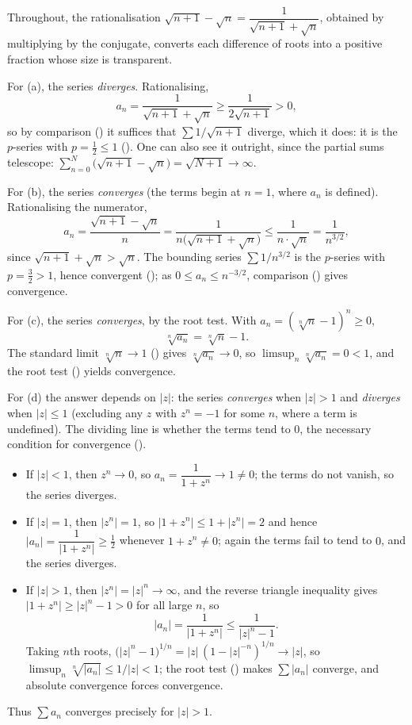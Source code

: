 \documentclass[main.tex]{subfiles}
\begin{document}
\begin{SolutionBlue}
Throughout, the rationalisation $\sqrt{n+1}-\sqrt n=\dfrac{1}{\sqrt{n+1}+\sqrt n}$, obtained by
multiplying by the conjugate, converts each difference of roots into a positive fraction whose size is
transparent.

For (a), the series \emph{diverges}. Rationalising,
\[
a_n=\frac{1}{\sqrt{n+1}+\sqrt n}\ge\frac{1}{2\sqrt{n+1}}>0,
\]
so by comparison () it suffices that $\sum 1/\sqrt{n+1}$ diverge, which it does: it is the
$p$-series with $p=\tfrac12\le 1$ (). One can also see it outright, since the partial sums
telescope: $\sum_{n=0}^{N}\bigl(\sqrt{n+1}-\sqrt n\bigr)=\sqrt{N+1}\to\infty$.

For (b), the series \emph{converges} (the terms begin at $n=1$, where $a_n$ is defined). Rationalising
the numerator,
\[
a_n=\frac{\sqrt{n+1}-\sqrt n}{n}=\frac{1}{n\bigl(\sqrt{n+1}+\sqrt n\bigr)}
   \le\frac{1}{n\cdot\sqrt n}=\frac{1}{n^{3/2}} ,
\]
since $\sqrt{n+1}+\sqrt n>\sqrt n$. The bounding series $\sum 1/n^{3/2}$ is the $p$-series with
$p=\tfrac32>1$, hence convergent (); as $0\le a_n\le n^{-3/2}$, comparison
() gives convergence.

For (c), the series \emph{converges}, by the root test. With $a_n=(\sqrt[n]{n}-1)^n\ge 0$,
\[
\sqrt[n]{a_n}=\sqrt[n]{n}-1 .
\]
The standard limit $\sqrt[n]{n}\to 1$ () gives $\sqrt[n]{a_n}\to 0$, so
$\limsup_{n}\sqrt[n]{a_n}=0<1$, and the root test () yields convergence.

For (d) the answer depends on $|z|$: the series \emph{converges} when $|z|>1$ and \emph{diverges} when
$|z|\le 1$ (excluding any $z$ with $z^n=-1$ for some $n$, where a term is undefined). The dividing line
is whether the terms tend to $0$, the necessary condition for convergence ().
\begin{itemize}[leftmargin=1.5em,itemsep=2pt,topsep=2pt]
  \item If $|z|<1$, then $z^n\to 0$, so $a_n=\dfrac{1}{1+z^n}\to 1\neq 0$; the terms do not vanish, so
        the series diverges.
  \item If $|z|=1$, then $|z^n|=1$, so $|1+z^n|\le 1+|z^n|=2$ and hence
        $|a_n|=\dfrac{1}{|1+z^n|}\ge\tfrac12$ whenever $1+z^n\neq 0$; again the terms fail to tend to
        $0$, and the series diverges.
  \item If $|z|>1$, then $|z^n|=|z|^n\to\infty$, and the reverse triangle inequality gives
        $|1+z^n|\ge |z|^n-1>0$ for all large $n$, so
        \[
        |a_n|=\frac{1}{|1+z^n|}\le\frac{1}{|z|^n-1}.
        \]
        Taking $n$th roots, $\bigl(|z|^n-1\bigr)^{1/n}=|z|\,(1-|z|^{-n})^{1/n}\to|z|$, so
        $\limsup_n\sqrt[n]{|a_n|}\le 1/|z|<1$; the root test () makes $\sum|a_n|$
        converge, and absolute convergence forces convergence.
\end{itemize}
Thus $\sum a_n$ converges precisely for $|z|>1$.
\end{SolutionBlue}
\end{document}
